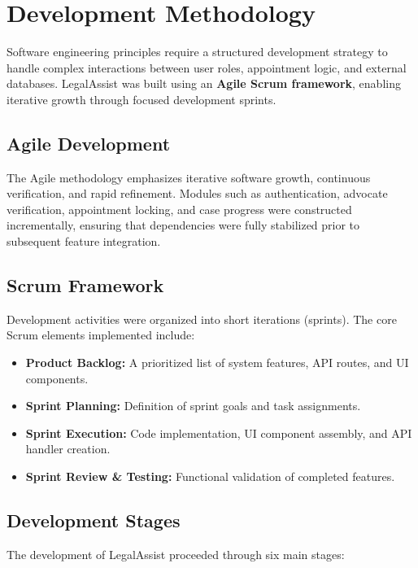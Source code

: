 \chapter{Development Methodology}

Software engineering principles require a structured development strategy to handle complex interactions between user roles, appointment logic, and external databases. LegalAssist was built using an \textbf{Agile Scrum framework}, enabling iterative growth through focused development sprints.

\section{Agile Development}
The Agile methodology emphasizes iterative software growth, continuous verification, and rapid refinement. Modules such as authentication, advocate verification, appointment locking, and case progress were constructed incrementally, ensuring that dependencies were fully stabilized prior to subsequent feature integration.

\section{Scrum Framework}
Development activities were organized into short iterations (sprints). The core Scrum elements implemented include:
\begin{itemize}
    \item \textbf{Product Backlog:} A prioritized list of system features, API routes, and UI components.
    \item \textbf{Sprint Planning:} Definition of sprint goals and task assignments.
    \item \textbf{Sprint Execution:} Code implementation, UI component assembly, and API handler creation.
    \item \textbf{Sprint Review \& Testing:} Functional validation of completed features.
\end{itemize}

\section{Development Stages}
The development of LegalAssist proceeded through six main stages:

